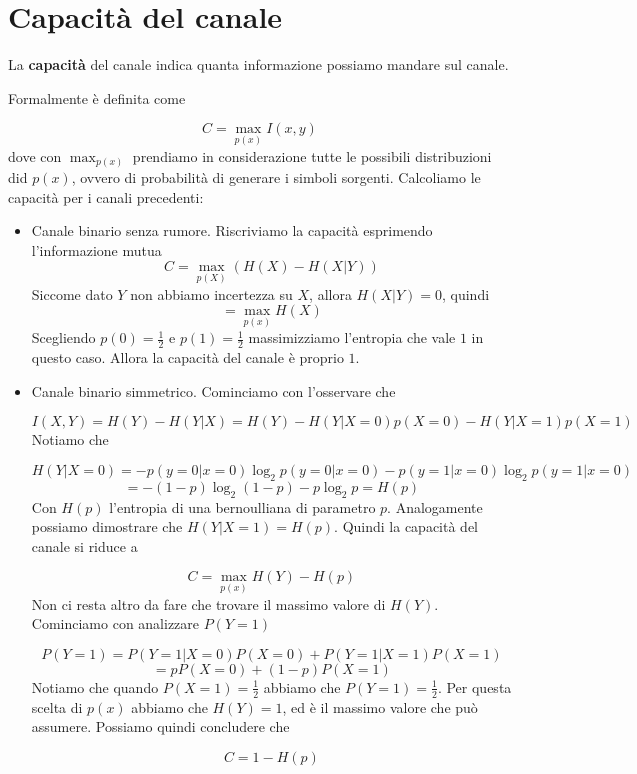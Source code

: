 \documentclass[12pt]{report}
\begin{document}
    \section{Capacità del canale}

    \begin{defi}
        La \textbf{capacità} del canale indica quanta informazione possiamo mandare sul canale.
    \end{defi}
    Formalmente è definita come

    $$C = \max_{p(x)} I(x,y)$$
    dove con $\max_{p(x)}$ prendiamo in considerazione tutte le possibili distribuzioni did $p(x)$, ovvero di probabilità di generare i simboli sorgenti. Calcoliamo le capacità per i canali precedenti:

    \begin{itemize}
        \item Canale binario senza rumore. Riscriviamo la capacità esprimendo l'informazione mutua
        $$C = \max_{p(X)} (H(X) - H(X|Y))$$
        Siccome dato $Y$ non abbiamo incertezza su $X$, allora $H(X|Y) = 0$, quindi
        $$= \max_{p(x)} H(X)$$
        Scegliendo $p(0) = \frac{1}{2}$ e $p(1) = \frac{1}{2}$ massimizziamo l'entropia che vale $1$ in questo caso. Allora la capacità del canale è proprio $1$.
        \item Canale binario simmetrico. Cominciamo con l'osservare che

        $$I(X,Y) = H(Y) - H(Y|X) = H(Y) - H(Y | X = 0) p(X = 0) - H(Y | X = 1) p(X = 1)$$
        Notiamo che

        $$H(Y|X = 0) = - p(y=0|x = 0)\log_2{p(y=0|x = 0)} -  p(y=1|x = 0)\log_2{p(y=1|x = 0)}$$
        $$= - (1-p) \log_2{(1-p)} - p\log_2{p} = H(p)$$
        Con $H(p)$ l'entropia di una bernoulliana di parametro $p$. Analogamente possiamo dimostrare che  $H(Y|X = 1) = H(p)$. Quindi la capacità del canale si riduce a

        $$C = \max_{p(x)} H(Y) - H(p)$$
        Non ci resta altro da fare che trovare il massimo valore di $H(Y)$. Cominciamo con analizzare $P(Y = 1)$

        $$P(Y = 1) = P(Y=1 | X = 0) P(X = 0) + P(Y=1 | X = 1) P(X = 1)$$
        $$= p P(X = 0) + (1-p) P(X = 1)$$
        Notiamo che  quando $P(X=1) = \frac{1}{2}$ abbiamo che $P(Y=1) = \frac{1}{2}$. Per questa scelta di $p(x)$ abbiamo che $H(Y) = 1$, ed è il massimo valore che può assumere. Possiamo quindi concludere che

        $$C =  1 - H(p)$$
    \end{itemize}
\end{document}

